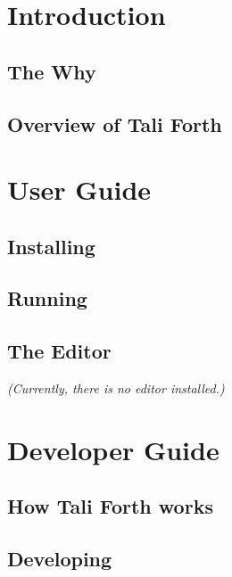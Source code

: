 \documentclass[a4paper,notitlepage]{report}
\begin{document}
\tableofcontents
\listoffigures
\listoftables

\part{Introduction}

\chapter{The Why}
        

\chapter{Overview of Tali Forth}
        

\part{User Guide}

\chapter{Installing}
        

\chapter{Running}
        

\chapter{The Editor}
\textit{(Currently, there is no editor installed.)}


\part{Developer Guide}

\chapter{How Tali Forth works}
        

\chapter{Developing}
        
\end{document}
